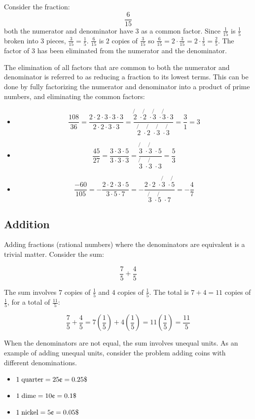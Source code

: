 \documentclass{article}
\begin{document}
Consider the fraction: 
\[\frac{6}{15}\] 
both the numerator and denominator have \(3\) as a common factor. Since \(\frac{1}{15}\) is \(\frac{1}{5}\) broken into \(3\) pieces, \(\frac{3}{15} = \frac{1}{5}\). \(\frac{6}{15}\) is \(2\) copies of \(\frac{3}{15}\) so \(\frac{6}{15} = 2 \cdot \frac{3}{15} = 2 \cdot \frac{1}{5} = \frac{2}{5}\). The factor of \(3\) has been eliminated from the numerator and the denominator.

The elimination of all factors that are common to both the numerator and denominator is referred to as reducing a fraction to its lowest terms. This can be done by fully factorizing the numerator and denominator into a product of prime numbers, and eliminating the common factors:

\begin{itemize}
\item \[\frac{108}{36} = \frac{2 \cdot 2 \cdot 3 \cdot 3 \cdot 3}{2 \cdot 2 \cdot 3 \cdot 3} = \frac{\not{2} \;\cdot \not{2} \;\cdot \not{3} \;\cdot \not{3} \cdot 3}{\not{2} \;\cdot \not{2} \;\cdot \not{3} \;\cdot \not{3}} = \frac{3}{1} = 3\]
\item \[\frac{45}{27} = \frac{3 \cdot 3 \cdot 5}{3 \cdot 3 \cdot 3} = \frac{\not{3} \;\cdot \not{3} \;\cdot 5}{\not{3} \;\cdot \not{3} \;\cdot 3} = \frac{5}{3}\]
\item \[\frac{-60}{105} = -\frac{2 \cdot 2 \cdot 3 \cdot 5}{3 \cdot 5 \cdot 7} = -\frac{2 \cdot 2 \;\cdot \not{3} \;\cdot \not{5}}{\not{3} \;\cdot \not{5} \;\cdot 7} = -\frac{4}{7}\]
\end{itemize}



\subsection{Addition}

Adding fractions (rational numbers) where the denominators are equivalent is a trivial matter. Consider the sum:

\[\frac{7}{5} + \frac{4}{5}\]

The sum involves \(7\) copies of \(\frac{1}{5}\) and \(4\) copies of \(\frac{1}{5}\). The total is \(7 + 4 = 11\) copies of \(\frac{1}{5}\), for a total of \(\frac{11}{5}\):

\[\frac{7}{5} + \frac{4}{5} = 7(\frac{1}{5}) + 4(\frac{1}{5}) = 11(\frac{1}{5}) = \frac{11}{5}\]


When the denominators are not equal, the sum involves unequal units. As an example of adding unequal units, consider the problem adding coins with different denominations. 
\begin{itemize}
\item \(1 \; \text{quarter} = 25\text{\textcent} = 0.25\$\) 
\item \(1 \; \text{dime} = 10\text{\textcent} = 0.1\$\)
\item \(1 \; \text{nickel} = 5\text{\textcent} = 0.05\$\) 
\end{itemize}
\end{document}

